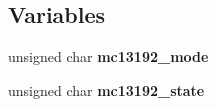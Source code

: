\subsection*{Variables}
\begin{CompactItemize}
\item 
unsigned char {\bf mc13192\_\-mode}
\item 
unsigned char {\bf mc13192\_\-state}
\end{CompactItemize}
